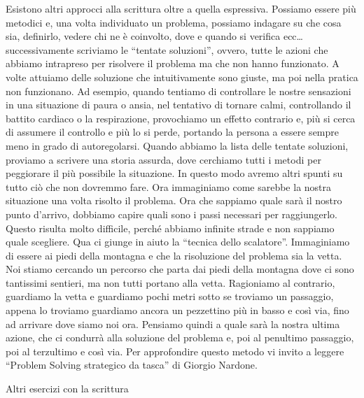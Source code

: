\documentclass[12pt]{book} %
\begin{document}
Esistono altri approcci alla scrittura oltre a quella espressiva. Possiamo essere più metodici e, una volta individuato
un problema, possiamo indagare su che cosa sia, definirlo, vedere chi ne è coinvolto, dove e quando si verifica ecc…
successivamente scriviamo le “tentate soluzioni”, ovvero, tutte le azioni che abbiamo intrapreso per risolvere il
problema ma che non hanno funzionato. A volte attuiamo delle soluzione che intuitivamente sono giuste, ma
poi nella pratica non funzionano. Ad esempio, quando tentiamo di controllare le nostre sensazioni in una situazione di
paura o ansia, nel tentativo di tornare calmi, controllando il battito cardiaco o la respirazione, provochiamo un effetto
contrario e, più si cerca di assumere il controllo e più lo si perde, portando la persona a essere sempre meno in grado
di autoregolarsi. Quando abbiamo la lista delle tentate soluzioni, proviamo a scrivere una storia assurda, dove
cerchiamo tutti i metodi per peggiorare il più possibile la situazione. In questo modo avremo altri spunti su tutto ciò
che non dovremmo fare. Ora immaginiamo come sarebbe la nostra
situazione una volta risolto il problema. Ora che sappiamo quale sarà il nostro punto d'arrivo, dobbiamo capire quali sono i passi necessari per
raggiungerlo. Questo risulta molto difficile, perché abbiamo infinite strade e non sappiamo quale scegliere. Qua ci
giunge in aiuto la “tecnica dello scalatore”. Immaginiamo di essere ai piedi della montagna e che la risoluzione del
problema sia la vetta. Noi stiamo cercando un percorso che parta dai piedi della montagna dove ci sono tantissimi
sentieri, ma non tutti portano alla vetta. Ragioniamo al contrario, guardiamo la vetta e guardiamo pochi metri sotto se
troviamo un passaggio, appena lo troviamo guardiamo ancora un pezzettino più in basso e così via, fino ad arrivare dove
siamo noi ora. Pensiamo quindi a quale sarà la nostra ultima azione, che ci condurrà alla soluzione del
problema e, poi al penultimo passaggio, poi al terzultimo e così via. 
Per approfondire questo metodo vi invito a leggere “Problem Solving strategico da
tasca” di Giorgio
Nardone.

Altri esercizi con la scrittura
\end{document}
